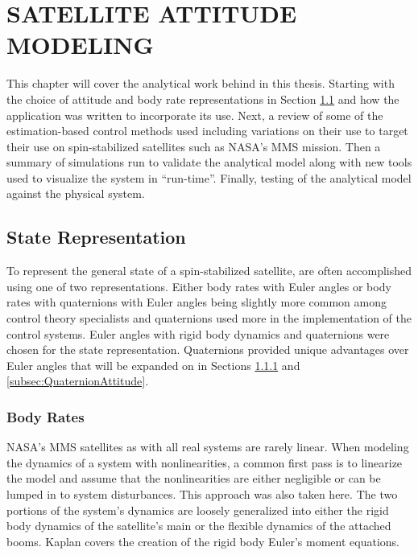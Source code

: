 
\chapter{SATELLITE ATTITUDE MODELING}
\label{chap:SatelliteAttitudeModeling}

This chapter will cover the analytical work behind in this thesis.  Starting with the choice of attitude and body rate representations in Section \ref{sec:StateRepresentation} and how the application was written to incorporate its use.  Next, a review of some of the estimation-based control methods used including variations on their use to target their use on spin-stabilized satellites such as NASA's MMS mission.  Then a summary of simulations run to validate the analytical model along with new tools used to visualize the system in ``run-time''.  Finally, testing of the analytical model against the physical system.

\section{State Representation}
\label{sec:StateRepresentation}

To represent the general state of a spin-stabilized satellite, are often accomplished using one of two representations.  Either body rates with Euler angles or body rates with quaternions with Euler angles being slightly more common among control theory specialists and quaternions used more in the implementation of the control systems.  Euler angles with rigid body dynamics and quaternions were chosen for the state representation.  Quaternions provided unique advantages over Euler angles that will be expanded on in Sections \ref{subsec:BodyRate} and \ref{subsec:QuaternionAttitude}.

\subsection{Body Rates}
\label{subsec:BodyRate}

NASA's MMS satellites as with all real systems are rarely linear.  When modeling the dynamics of a system with nonlinearities, a common first pass is to linearize the model and assume that the nonlinearities are either negligible or can be lumped in to system disturbances.  This approach was also taken here.  The two portions of the system's dynamics are loosely generalized into either the rigid body dynamics of the satellite's main or the flexible dynamics of the attached booms.  Kaplan \cite{kaplan} covers the creation of the rigid body Euler's moment equations.


